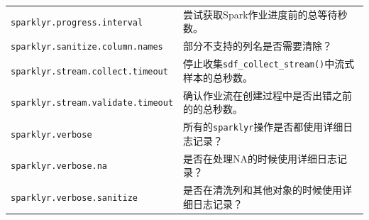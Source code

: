 \documentclass[
]{article}
\begin{document}
\begin{longtable}[]{@{}ll@{}}
\begin{minipage}[t]{0.47\columnwidth}
\texttt{sparklyr.progress.interval}\strut
\end{minipage} & \begin{minipage}[t]{0.47\columnwidth}\raggedright
尝试获取Spark作业进度前的总等待秒数。\strut
\end{minipage}\tabularnewline
\begin{minipage}[t]{0.47\columnwidth}\raggedright
\texttt{sparklyr.sanitize.column.names}\strut
\end{minipage} & \begin{minipage}[t]{0.47\columnwidth}\raggedright
部分不支持的列名是否需要清除？\strut
\end{minipage}\tabularnewline
\begin{minipage}[t]{0.47\columnwidth}\raggedright
\texttt{sparklyr.stream.collect.timeout}\strut
\end{minipage} & \begin{minipage}[t]{0.47\columnwidth}\raggedright
停止收集\texttt{sdf\_collect\_stream()}中流式样本的总秒数。\strut
\end{minipage}\tabularnewline
\begin{minipage}[t]{0.47\columnwidth}\raggedright
\texttt{sparklyr.stream.validate.timeout}\strut
\end{minipage} & \begin{minipage}[t]{0.47\columnwidth}\raggedright
确认作业流在创建过程中是否出错之前的的总秒数。\strut
\end{minipage}\tabularnewline
\begin{minipage}[t]{0.47\columnwidth}\raggedright
\texttt{sparklyr.verbose}\strut
\end{minipage} & \begin{minipage}[t]{0.47\columnwidth}\raggedright
所有的\texttt{sparklyr}操作是否都使用详细日志记录？\strut
\end{minipage}\tabularnewline
\begin{minipage}[t]{0.47\columnwidth}\raggedright
\texttt{sparklyr.verbose.na}\strut
\end{minipage} & \begin{minipage}[t]{0.47\columnwidth}\raggedright
是否在处理NA的时候使用详细日志记录？\strut
\end{minipage}\tabularnewline
\begin{minipage}[t]{0.47\columnwidth}\raggedright
\texttt{sparklyr.verbose.sanitize}\strut
\end{minipage} & \begin{minipage}[t]{0.47\columnwidth}\raggedright
是否在清洗列和其他对象的时候使用详细日志记录？\strut

\end{minipage}
\end{longtable}
\end{document}
